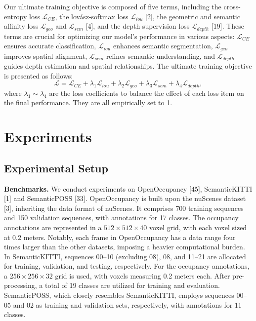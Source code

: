 \documentclass[10pt,twocolumn,letterpaper]{article}
\begin{document}
Our ultimate training objective is composed of five terms, including the cross-entropy loss $\mathcal{L}_{CE}$, the lovász-softmax loss $\mathcal{L}_{iou}$ [2], the geometric and semantic affinity loss $\mathcal{L}_{geo}$ and $\mathcal{L}_{sem}$ [4], and the depth supervision loss $\mathcal{L}_{depth}$ [19]. These terms are crucial for optimizing our model's performance in various aspects: $\mathcal{L}_{CE}$ ensures accurate classification, $\mathcal{L}_{iou}$ enhances semantic segmentation, $\mathcal{L}_{geo}$ improves spatial alignment, $\mathcal{L}_{sem}$ refines semantic understanding, and $\mathcal{L}_{depth}$ guides depth estimation and spatial relationships. The ultimate training objective is presented as follows:
\begin{equation}
  \mathcal{L} = \mathcal{L}_{CE} + \lambda_1 \mathcal{L}_{iou} + \lambda_2 \mathcal{L}_{geo} + \lambda_3 \mathcal{L}_{sem} + \lambda_4 \mathcal{L}_{depth},
  \label{eq:total_loss}
\end{equation}
where $\lambda_1 \sim \lambda_4$ are the loss coefficients to balance the effect of each loss item on the final performance. They are all empirically set to 1.


\section{Experiments}

\subsection{Experimental Setup}

\textbf{Benchmarks.}
We conduct experiments on OpenOccupancy [45], SemanticKITTI [1] and SemanticPOSS [33]. OpenOccupancy is built upon the nuScenes dataset [3], inheriting the data format of nuScenes. It comprises 700 training sequences and 150 validation sequences, with annotations for 17 classes. The occupancy annotations are represented in a $512 \times 512 \times 40$ voxel grid, with each voxel sized at 0.2 meters. Notably, each frame in OpenOccupancy has a data range four times larger than the other datasets, imposing a heavier computational burden. In SemanticKITTI, sequences 00--10 (excluding 08), 08, and 11--21 are allocated for training, validation, and testing, respectively. For the occupancy annotations, a $256 \times 256 \times 32$ grid is used, with voxels measuring 0.2 meters each. After pre-processing, a total of 19 classes are utilized for training and evaluation. SemanticPOSS, which closely resembles SemanticKITTI, employs sequences 00--05 and 02 as training and validation sets, respectively, with annotations for 11 classes.
\end{document}
